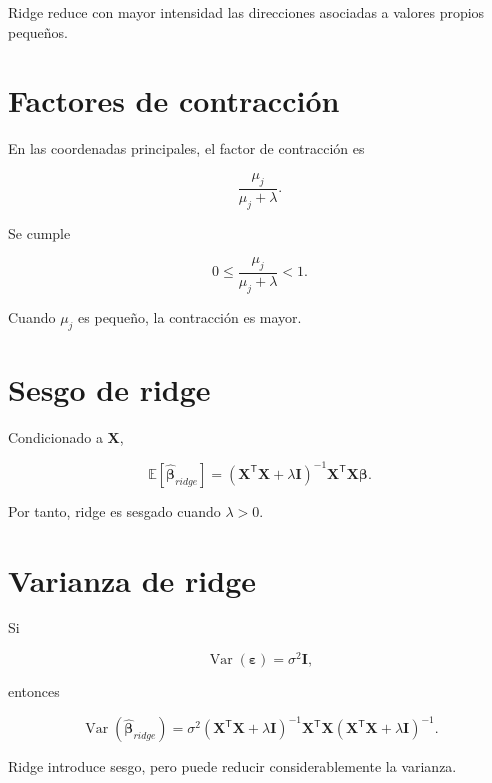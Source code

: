 \documentclass[
  spanish,
  10.5pt,
  letterpaper,
  DIV=11,
  numbers=noendperiod,
  oneside,
  open=any]{scrreprt}
\theoremstyle{definition}
\theoremstyle{definition}
\theoremstyle{plain}
\theoremstyle{remark}
\begin{document}
Ridge reduce con mayor intensidad las direcciones asociadas a valores
propios pequeños.

\section*{Factores de contracción}\label{factores-de-contracciuxf3n}


En las coordenadas principales, el factor de contracción es

\[
\frac{\mu_j}{\mu_j+\lambda}.
\]

Se cumple

\[
0
\leq
\frac{\mu_j}{\mu_j+\lambda}
<
1.
\]

Cuando \(\mu_j\) es pequeño, la contracción es mayor.

\section*{Sesgo de ridge}\label{sesgo-de-ridge}


Condicionado a \(\mathbf{X}\),

\[
\mathbb{E}
[
\widehat{\boldsymbol{\beta}}_{ridge}
]
=
\left(
\mathbf{X}^{\mathsf T}\mathbf{X}
+
\lambda\mathbf{I}
\right)^{-1}
\mathbf{X}^{\mathsf T}\mathbf{X}
\boldsymbol{\beta}.
\]

Por tanto, ridge es sesgado cuando \(\lambda>0\).

\section*{Varianza de ridge}\label{varianza-de-ridge}


Si

\[
\operatorname{Var}(\boldsymbol{\varepsilon})
=
\sigma^2\mathbf{I},
\]

entonces

\[
\operatorname{Var}
(
\widehat{\boldsymbol{\beta}}_{ridge}
)
=
\sigma^2
\left(
\mathbf{X}^{\mathsf T}\mathbf{X}
+
\lambda\mathbf{I}
\right)^{-1}
\mathbf{X}^{\mathsf T}\mathbf{X}
\left(
\mathbf{X}^{\mathsf T}\mathbf{X}
+
\lambda\mathbf{I}
\right)^{-1}.
\]

Ridge introduce sesgo, pero puede reducir considerablemente la varianza.
\end{document}
